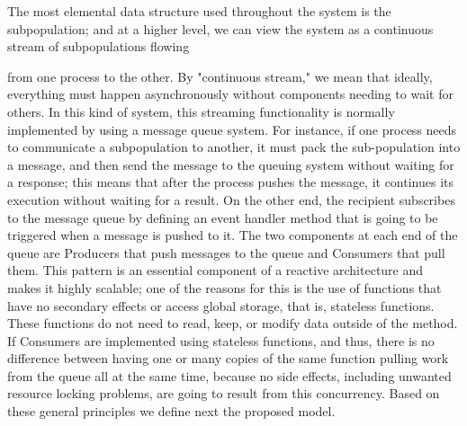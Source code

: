 \documentclass[review]{elsarticle}
\begin{document}
The most elemental data structure used throughout the system is the subpopulation; and at a higher
level, we can view the system as a continuous stream of subpopulations
flowing

from one process to the other. By "continuous stream," we mean that ideally,
everything must happen asynchronously without components needing to wait for
others. In this kind of system, this streaming functionality is normally
implemented by using a message queue system. For instance, if one process needs
to communicate a subpopulation to another, it must pack the sub-population into
a message, and then send the message 
to the queuing system without waiting for a response; this
means that after the process pushes the message, it continues its execution
without waiting for a result. On the other end, the recipient subscribes to the
message queue by defining an event handler method that is going to be triggered when a
message is pushed to it. The two components at each end of the queue are
Producers that push messages to the queue and Consumers that pull them. This
pattern is an essential component of a reactive architecture and makes
it 
highly scalable; one of the reasons for this is the use of functions
that have no secondary effects or access global storage, that is,
stateless functions. These functions do not need to read, keep, or modify data outside of the method. If
Consumers are implemented using stateless functions, and thus, there is no difference
between having one or many copies of the same function pulling work from the queue all at the
same time, because no side effects, including unwanted resource
locking problems,  are going to result from this concurrency.
Based on these general principles we define next the proposed model.
\end{document}
